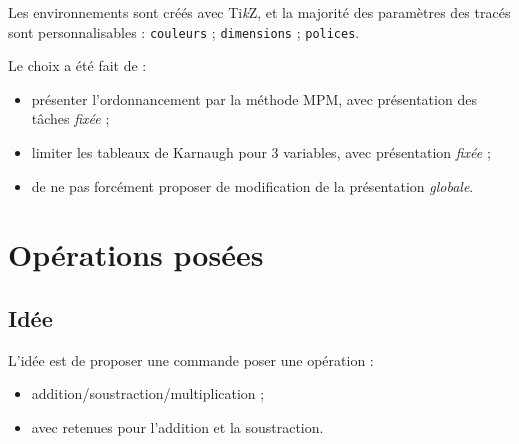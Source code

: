 \documentclass[french,a4paper,11pt]{article}
\providecommand\tikzlogo{Ti\textit{k}Z}
\let\TikZ\tikzlogo
\begin{document}
{{\begin{tipblock}
Les environnements sont créés avec \TikZ, et la majorité des paramètres des tracés sont personnalisables : \texttt{couleurs} ; \texttt{dimensions} ; \texttt{polices}.
\end{tipblock}

\begin{noteblock}
Le choix a été fait de :

\begin{itemize}
	\item présenter l'ordonnancement par la méthode MPM, avec présentation des tâches \textit{fixée} ;
	\item limiter les tableaux de Karnaugh pour 3 variables, avec présentation \textit{fixée} ;
	\item de ne pas forcément proposer de modification de la présentation \textit{globale}.
\end{itemize}
\vspace*{-\baselineskip}\leavevmode
\end{noteblock}

\pagebreak

\section{Opérations posées}

\subsection{Idée}

\begin{tipblock}
L'idée est de proposer une commande poser une opération :

\begin{itemize}
	\item addition/soustraction/multiplication ;
	\item avec retenues pour l'addition et la soustraction.
\end{itemize}
\vspace*{-\baselineskip}\leavevmode
\end{tipblock}

\begin{DemoCode}
\end{DemoCode}

\begin{DemoCode}[]
\end{DemoCode}

}}
\end{document}
